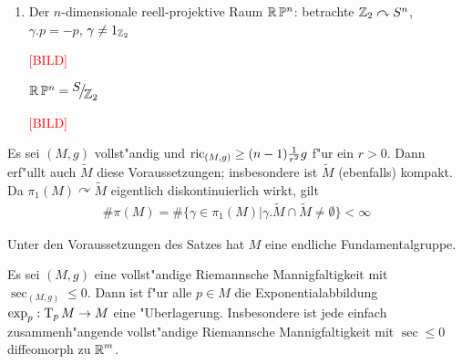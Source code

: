 \begin{Bsp}
\begin{enumerate}[label=\arabic*),leftmargin=*]
\begin{bew}
\begin{center}
\end{center}	
	\end{bew}
\item
	Der $n$-dimensionale reell-projektive Raum $\operatorname{\mathbb{R}}\mathbb{P}^n$: betrachte $\operatorname{\mathbb{Z}}_2 \curvearrowright S^n$, $\gamma.p = -p$, $\gamma \ne 1_{\operatorname{\mathbb{Z}}_2}$
	\begin{center}\textcolor{red}{[BILD]}\end{center}
	$\R\P^n = \FakRaum{S}{\Z_2}$
	\begin{center}\textcolor{red}{[BILD]}\end{center}
\end{enumerate}\end{Bsp}

Es sei $(M, g)$ vollst"andig und $\operatorname{ric}_{(M,g)} \ge (n-1) \frac{1}{r^2} g$ f"ur ein $r > 0$.
Dann erf"ullt auch $\tilde M$ diese Voraussetzungen; insbesondere ist $\tilde M$ (ebenfalls) kompakt. Da $\pi_1(M) \curvearrowright \tilde M$ eigentlich diskontinuierlich wirkt, gilt
\begin{align*}
\# \pi(M) = \# \{ \gamma \in \pi_1(M) | \gamma.\tilde{M} \cap \tilde M \ne \emptyset \} < \infty
\end{align*}

\begin{kor}
Unter den Voraussetzungen des Satzes hat $M$ eine endliche Fundamentalgruppe.
\end{kor}

\begin{Satz}
Es sei $(M,g)$ eine vollst"andige Riemannsche Mannigfaltigkeit mit $\sec_{(M,g)} \le 0$. Dann ist f"ur alle $p \in M$ die Exponentialabbildung $\exp_p: \operatorname{T}_pM \to M$ eine "Uberlagerung.
Insbesondere ist jede einfach zusammenh"angende vollst"andige Riemannsche Mannigfaltigkeit mit $\sec \le 0$ diffeomorph zu $\operatorname{\mathbb{R}}^m$.
\end{Satz}

